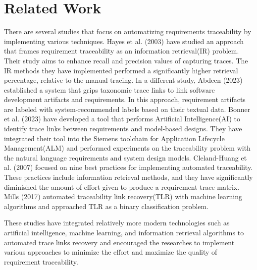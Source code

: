 \section{Related Work}
\label{section:related_work}

There are several studies that focus on automatizing requirements traceability by implementing various techniques. Hayes et al. (2003)\cite{hayes-2003} have studied an approach that frames requirement traceability as an information retrieval(IR) problem. Their study aims to enhance recall and precision values of capturing traces. The IR methods they have implemented performed a significantly higher retrieval percentage, relative to the manual tracing. In a different study, Abdeen (2023)\cite{abdeen-2023} established a system that grips taxonomic trace links to link software development artifacts and requirements. In this approach, requirement artifacts are labeled with system-recommended labels based on their textual data. Bonner et al. (2023)\cite{bonner-2023} have developed a tool that performs Artificial Intelligence(AI) to identify trace links between requirements and model-based designs. They have integrated their tool into the Siemens toolchain for Application Lifecycle Management(ALM) and performed experiments on the traceability problem with the natural language requirements and system design models. Cleland-Huang et al. (2007)\cite{cleland-huang-2007} focused on nine best practices for implementing automated traceability. These practices include information retrieval methods, and they have significantly diminished the amount of effort given to produce a requirement trace matrix. Mills (2017)\cite{mills-2017} automated traceability link recovery(TLR) with machine learning algorithms and approached TLR as a binary classification problem.

These studies have integrated relatively more modern technologies such as artificial intelligence, machine learning, and information retrieval algorithms to automated trace links recovery and encouraged the researches to implement various approaches to minimize the effort and maximize the quality of requirement traceability.

